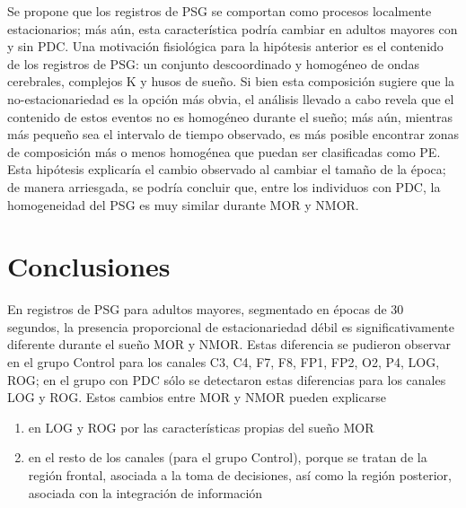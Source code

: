 \documentclass[12pt,a4paper]{mitthesis}
\begin{document}
Se propone que los registros de PSG se comportan como procesos localmente estacionarios; m\'as 
a\'un, esta caracter\'istica podr\'ia cambiar en adultos mayores con y sin PDC. 
Una motivaci\'on fisiol\'ogica para la hip\'otesis anterior es el contenido de los registros de
PSG: un conjunto descoordinado y homog\'eneo de ondas cerebrales, complejos K y husos de sue\~no.
Si bien esta composici\'on sugiere que la no-estacionariedad es la opci\'on m\'as obvia, el
an\'alisis llevado a cabo revela que el contenido de estos eventos no es homog\'eneo durante el
sue\~no; m\'as a\'un, mientras m\'as peque\~no sea el intervalo de tiempo observado, es m\'as
posible encontrar zonas de composici\'on m\'as o menos homog\'enea que puedan ser clasificadas
como PE.
Esta hip\'otesis explicar\'ia el cambio observado al cambiar el tama\~no de la \'epoca; de manera
arriesgada, se podr\'ia concluir que, entre los individuos con PDC, la homogeneidad del PSG es muy
similar durante MOR y NMOR.


\section{Conclusiones}

En registros de PSG para adultos mayores, segmentado en \'epocas de 30 segundos, la presencia 
proporcional de estacionariedad d\'ebil es significativamente diferente durante el sue\~no MOR y NMOR.
Estas diferencia se pudieron observar en el grupo Control para los canales C3, C4, F7, F8, FP1, 
FP2, O2, P4, LOG, ROG; en el grupo con PDC s\'olo se detectaron estas diferencias para los canales 
LOG y ROG.
Estos cambios entre MOR y NMOR pueden explicarse 
\begin{enumerate}
\item en LOG y ROG por las caracter\'isticas propias  del sue\~no MOR
\item en el resto de los canales (para el grupo Control), porque se tratan de la 
regi\'on frontal, asociada a la toma de decisiones, as\'i como la regi\'on posterior, 
asociada con la integraci\'on
de informaci\'on
\end{enumerate}
\end{document}

